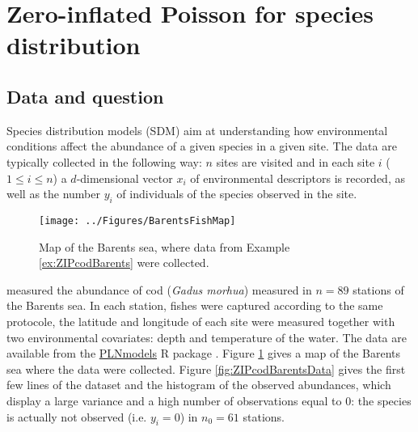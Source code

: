 \section{Zero-inflated Poisson for species distribution} \label{sec:zip}

\subsection{Data and question}
Species distribution models (SDM) aim at understanding how environmental conditions affect the abundance of a given species in a given site. The data are typically collected in the following way: $n$ sites are visited and in each site $i$ ($1 \leq i \leq n$) a $d$-dimensional vector $x_i$ of environmental descriptors is recorded, as well as the number $y_i$ of individuals of the species observed in the site.

\begin{figure}[ht]
  \begin{center}
    \texttt{[image: ../Figures/BarentsFishMap]}
    \caption{Map of the Barents sea, where data from Example \ref{ex:ZIPcodBarents} were collected. \label{fig:ZIPcodBarentsMap}}
  \end{center}
\end{figure}


\begin{dataset} \label{ex:ZIPcodBarents}
  \cite{fossheim2006fish} measured the abundance of cod ({\it Gadus morhua}) measured in $n=89$ stations of the Barents sea. In each station, fishes were captured according to the same protocole,  the latitude and longitude of each site were measured together with two environmental covariates: depth and temperature of the water. The data are available from the \url{PLNmodels} R package \citep{CMR21}. Figure \ref{fig:ZIPcodBarentsMap} gives a map of the Barents sea where the data were collected. Figure \ref{fig:ZIPcodBarentsData} gives the first few lines of the dataset and the histogram of the observed abundances, which display a large variance  and a high number of observations equal to $0$: the species is actually not observed (i.e. $y_i = 0$) in $n_0 = 61$ stations.
\end{dataset}

